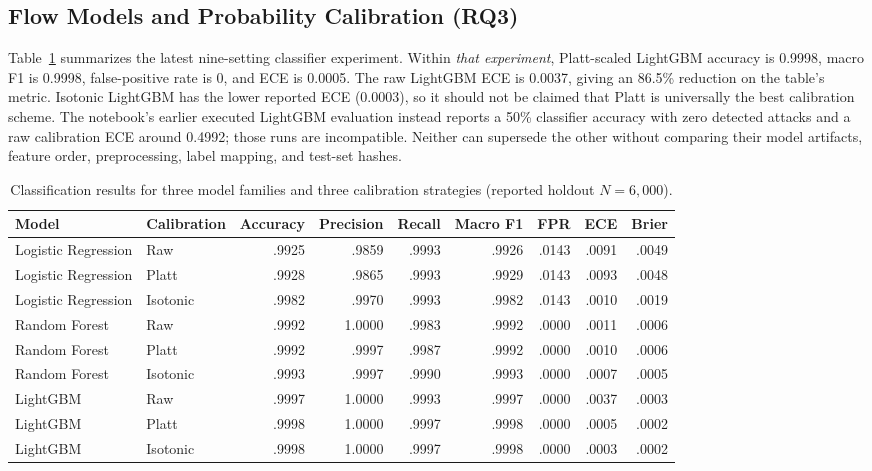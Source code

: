 \documentclass[journal,twoside]{IEEEtran}
\begin{document}
\subsection{Flow Models and Probability Calibration (RQ3)}
Table~\ref{tab:clf} summarizes the latest nine-setting classifier experiment. Within \emph{that experiment}, Platt-scaled LightGBM accuracy is 0.9998, macro F1 is 0.9998, false-positive rate is 0, and ECE is 0.0005. The raw LightGBM ECE is 0.0037, giving an 86.5\% reduction on the table's metric. Isotonic LightGBM has the lower reported ECE (0.0003), so it should not be claimed that Platt is universally the best calibration scheme. The notebook's earlier executed LightGBM evaluation instead reports a 50\% classifier accuracy with zero detected attacks and a raw calibration ECE around 0.4992; those runs are incompatible. Neither can supersede the other without comparing their model artifacts, feature order, preprocessing, label mapping, and test-set hashes.
\begin{table}[!t]
\caption{Classification results for three model families and three calibration strategies (reported holdout $N=6{,}000$).}
\label{tab:clf}\centering\scriptsize
\begin{tabular}{llrrrrrrr}
\toprule Model & Calibration & Accuracy & Precision & Recall & Macro F1 & FPR & ECE & Brier\\\midrule
Logistic Regression & Raw & .9925 & .9859 & .9993 & .9926 & .0143 & .0091 & .0049\\
Logistic Regression & Platt & .9928 & .9865 & .9993 & .9929 & .0143 & .0093 & .0048\\
Logistic Regression & Isotonic & .9982 & .9970 & .9993 & .9982 & .0143 & .0010 & .0019\\
Random Forest & Raw & .9992 & 1.0000 & .9983 & .9992 & .0000 & .0011 & .0006\\
Random Forest & Platt & .9992 & .9997 & .9987 & .9992 & .0000 & .0010 & .0006\\
Random Forest & Isotonic & .9993 & .9997 & .9990 & .9993 & .0000 & .0007 & .0005\\
LightGBM & Raw & .9997 & 1.0000 & .9993 & .9997 & .0000 & .0037 & .0003\\
LightGBM & Platt & .9998 & 1.0000 & .9997 & .9998 & .0000 & .0005 & .0002\\
LightGBM & Isotonic & .9998 & 1.0000 & .9997 & .9998 & .0000 & .0003 & .0002\\\bottomrule
\end{tabular}
\end{table}
\end{document}
